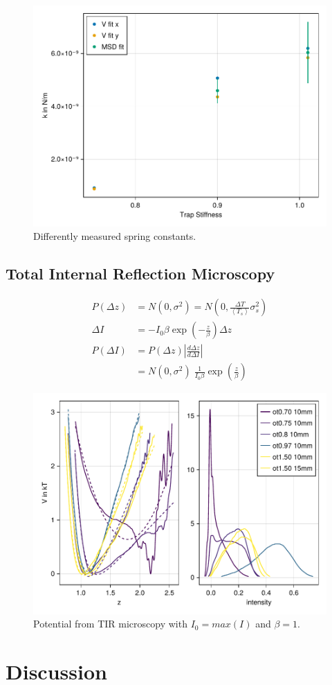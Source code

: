 \documentclass[
    parskip=half, 
    twoside=false,
    twocolumn=true,
    fontsize=11pt,
]{scrarticle}
\begin{document}
\begin{figure}[h]
    \centering
    \includegraphics{figures/01_03_4_spring_constants.pdf}
    \caption{Differently measured spring constants.}
\end{figure}

\clearpage
\subsection{Total Internal Reflection Microscopy}
\begin{align}
    P(\Delta z) &= N(0, \sigma^2) = N\left(0, \frac{\Delta T}{\left<T_s\right>} \sigma_s^2\right)\\
    \Delta I &= - I_0 \beta \exp\left(-\frac{z}{\beta}\right) \Delta z \\
    P(\Delta I) &= P(\Delta z) \left|\frac{d \Delta z}{d \Delta I}\right|\\
    &= N(0, \sigma^2) \;\frac{1}{I_0\beta} \exp\left(\frac{z}{\beta}\right)
\end{align}

\begin{figure}[h]
    \centering
    \includegraphics{figures/02_potential.pdf}
    \caption{Potential from TIR microscopy with $I_0 = max(I)$ and $\beta = 1$.}
\end{figure}

\clearpage
\section{Discussion}
\end{document}
